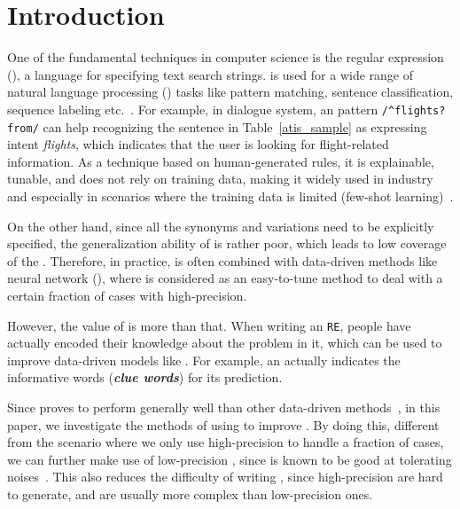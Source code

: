 \section{Introduction}


One of the fundamental techniques in computer science is the regular expression (\RE), a language for specifying text search strings.  \RE
is used for a wide range of natural language processing (\NLP) tasks like pattern matching, sentence classification, sequence labeling
etc.~\cite{chang2014tokensregex}. For example, in dialogue system, an \RE pattern \texttt{/\textasciicircum flights? from/} can help
recognizing the sentence in Table~\ref{atis_sample} as expressing intent \emph{flights}, which indicates that the user is looking for
flight-related information. As a technique based on human-generated rules, it is explainable, tunable, and does not rely on training data,
making it widely used in industry and especially in scenarios where the training data is limited (few-shot learning)~\cite{gc2015big}.

On the other hand, since all the synonyms and variations need to be explicitly specified, the generalization ability of \RE is rather poor,
which leads to low coverage of the \REs. Therefore, in practice, \RE is often combined with data-driven methods like neural network
(\NN), where \RE is considered as an easy-to-tune method to deal with a certain fraction of cases with high-precision.

However, the value of \RE is more than that. When writing an \texttt{RE}, people have actually encoded their knowledge about the problem in it, which can be used to improve data-driven models like \NN. For example, an \RE actually indicates the informative words
(\textbf{\emph{clue words}}) for its prediction.

Since \NN proves to perform generally well than other data-driven methods~\cite{kim2014convolutional, bahdanau2014neural}, in this paper,
we investigate the methods of using \RE to improve \NN. By doing this, different from the scenario where we only use high-precision
\REs to handle a fraction of cases, we can further make use of low-precision \REs, since \NN is known to be good at
tolerating noises~\cite{xie2016disturblabel}. This also reduces the difficulty of writing \REs, since high-precision \REs
are hard to generate, and are usually more complex than low-precision ones.


